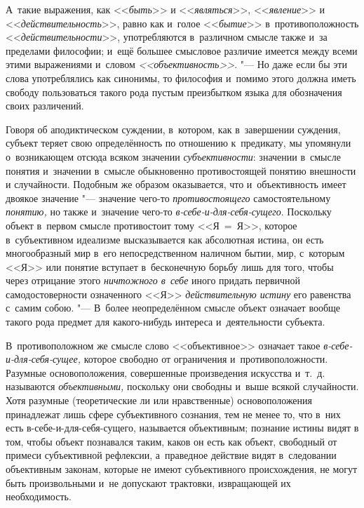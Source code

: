 А~такие выражения, как <<{\em быть}>> и <<{\em являться}>>,
<<{\em явление}>> и <<{\em действительность}>>, равно как и~голое
<<{\em бытие}>> в~противоположность <<{\em действительности}>>,
употребляются в~различном смысле также и~за пределами
философии; и~ещё большее смысловое различие имеется между всеми этими
выражениями и~словом {\em <<объективность>>}. "---
Но даже если бы эти слова употреблялись как синонимы, то
философия и~помимо этого должна иметь свободу пользоваться такого рода
пустым преизбытком языка для обозначения своих различений.

Говоря об аподиктическом суждении, в~котором, как в~завершении
суждения, субъект теряет свою определённость по отношению к~предикату, мы
упомянули о~возникающем отсюда всяком значении {\em субъективности}:
значении в~смысле понятия и~значении в~смысле обыкновенно
противостоящей понятию внешности и
случайности.
Подобным же образом оказывается, что и~объективность имеет
двоякое значение "--- значение чего-то {\em противостоящего}
самостоятельному {\em понятию,} но также и~значение чего-то
{\em в-себе-и-для-себя-сущего}.
Поскольку объект в~первом смысле противостоит тому <<Я~=~Я>>,
которое в~субъективном идеализме высказывается как абсолютная истина, он
есть многообразный мир в~его непосредственном наличном
бытии, мир, с~которым <<Я>> или понятие вступает в~бесконечную борьбу лишь
для того, чтобы через отрицание этого {\em ничтожного в~себе}
иного придать первичной самодостоверности означенного <<Я>>
{\em действительную истину} его равенства с~самим
собою.
"--- В~более неопределённом смысле объект означает вообще такого
рода предмет для какого-нибудь интереса и~деятельности субъекта.

В~противоположном же смысле слово <<объективное>> означает такое
{\em в-себе-и-для-себя-сущее,}
которое свободно от ограничения и~противоположности. Разумные
основоположения, совершенные произведения искусства и~т.~д. называются
{\em объективными,}
поскольку они свободны и~выше всякой случайности. Хотя
разумные (теоретические ли или нравственные) основоположения принадлежат
лишь сфере субъективного сознания, тем не менее то, что в~них есть
в-себе-и-для-себя-сущего, называется объективным; познание истины видят в
том, чтобы объект познавался таким, каков он есть как объект, свободный от
примеси субъективной рефлексии, а~праведное действие видят в~следовании
объективным законам, которые не имеют субъективного происхождения, не могут
быть произвольными и~не допускают трактовки, извращающей их необходимость.

